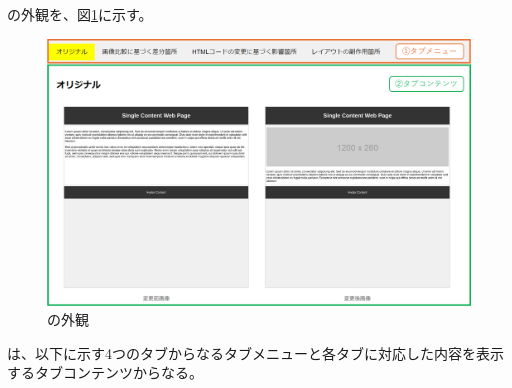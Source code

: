 \toolName の外観を、図\ref{fig: Appearance}に示す。
\begin{figure}[tp]
    \begin{center}
        \includegraphics[width=1.0\columnwidth]{image/3_Outline_Appearance.png}
        \caption{\toolName の外観}
        \label{fig: Appearance}
    \end{center}
\end{figure}
\toolName は、以下に示す4つのタブからなるタブメニューと各タブに対応した内容を表示するタブコンテンツからなる。
